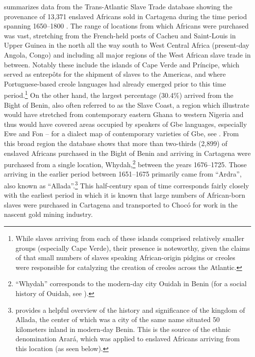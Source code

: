 \documentclass[output=paper,colorlinks,citecolor=brown]{langscibook}
\begin{document}
 summarizes data from the Trans-Atlantic Slave Trade database showing the provenance of 13,371 enslaved Africans sold in Cartagena during the time period spanning 1650--1800 \citep{VoyagesDatabase_2009}. The range of locations from which Africans were purchased was vast, stretching from the French-held posts of Cacheu and Saint-Louis in Upper Guinea in the north all the way south to West Central Africa (present-day Angola, Congo) and including all major regions of the West African slave trade in between. Notably these include the islands of Cape Verde and Príncipe, which served as entrepôts for the shipment of slaves to the Americas, and where Portuguese-based creole languages had already emerged prior to this time period.\footnote{While slaves arriving from each of these islands comprised relatively smaller groups (especially Cape Verde), their presence is noteworthy, given the claims of \citet{McWhorter_1999,McWhorter_2006} that small numbers of slaves speaking African-origin pidgins or creoles were responsible for catalyzing the creation of creoles across the Atlantic.} On the other hand, the largest percentage (30.4\%) arrived from the Bight of Benin, also often referred to as the Slave Coast, a region which \citet[110--112]{Eltis_Richardson_2010} illustrate would have stretched from contemporary eastern Ghana to western Nigeria and thus would have covered areas occupied by speakers of Gbe languages, especially Ewe and Fon – for a dialect map of contemporary varieties of Gbe, see \citet[xxiii--xxiv]{Capo_1991}. From this broad region the database shows that more than two-thirds (2,899) of enslaved Africans purchased in the Bight of Benin and arriving in Cartagena were purchased from a single location, Whydah,\footnote{“Whydah” corresponds to the modern-day city Ouidah in Benin (for a social history of Ouidah, see \citealt{Law_2004}).} between the years 1676--1725. Those arriving in the earlier period between 1651--1675 primarily came from “Ardra”, also known as “Allada”.\footnote{\citet[Ch.2]{Aboh_2015} provides a helpful overview of the history and significance of the kingdom of Allada, the center of which was a city of the same name situated 50 kilometers inland in modern-day Benin. This is the source of the ethnic denomination Arará, which was applied to enslaved Africans arriving from this location (as seen below).} This half-century span of time corresponds fairly closely with the earliest period in which it is known that large numbers of African-born slaves were purchased in Cartagena and transported to Chocó for work in the nascent gold mining industry.
\end{document}
